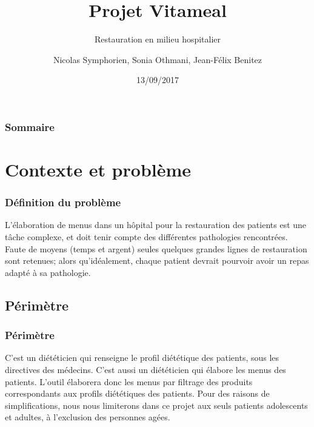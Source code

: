 \documentclass{beamer}
\title{Projet Vitameal}
\subtitle{Restauration en milieu hospitalier}
\author{Nicolas Symphorien, Sonia Othmani, Jean-Félix Benitez} %
\institute{CNAM}
\date{13/09/2017}
\begin{document}
\begin{frame}[plain]
  \titlepage
\end{frame}

\begin{frame}
  \frametitle{Sommaire}
  \tableofcontents
\end{frame}

\section{Contexte et problème}
\begin{frame}[label=definitionDuProbleme]
  \frametitle{Définition du problème}
  \rightskip=0pt\leftskip=0pt
L'élaboration de menus dans un hôpital pour la restauration des patients
est une tâche complexe, et doit tenir compte des différentes pathologies
rencontrées. Faute de moyens (temps et argent) seules quelques grandes
lignes de restauration sont retenues; alors qu'idéalement, chaque
patient devrait pourvoir avoir un repas adapté à sa pathologie.
\end{frame}


\subsection{Périmètre}
\begin{frame}[label=perimetre]
  \frametitle{Périmètre}
  \rightskip=0pt\leftskip=0pt
C'est un diététicien qui renseigne le profil diététique des patients,
sous les directives des médecins. C'est aussi un diététicien qui élabore
les menus des patients. L'outil élaborera donc
les menus par filtrage des produits correspondants aux profils
diététiques des patients. Pour des raisons de simplifications, nous nous limiterons dans ce projet aux seuls patients adolescents et adultes, à l'exclusion des personnes agées.
\end{frame}
\end{document}
